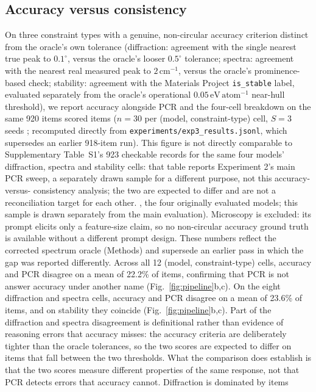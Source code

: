 \documentclass[pdflatex,sn-nature]{sn-jnl}
\newcommand{\rev}[1]{#1} %
\newcommand{\rev}[1]{{\color{blue}#1}} %
\providecommand{\DIFadd}[1]{{\protect\color{blue} \sf #1}} %
\providecommand{\DIFdel}[1]{{\protect\color{red} \scriptsize #1}} %
\providecommand{\DIFaddbegin}{} %
\providecommand{\DIFaddend}{} %
\providecommand{\DIFdelbegin}{} %
\providecommand{\DIFdelend}{} %
\providecommand{\DIFscaledelfig}{0.5}
\newlength{\DIFdelgraphicswidth} %
\newlength{\DIFdelgraphicsheight} %
\providecommand{\DIFaddincludegraphics}[2][]{{\color{blue}\fbox{\DIFOincludegraphics[#1]{#2}}}} %
\providecommand{\DIFdelincludegraphics}[2][]{%
\sbox{\DIFdelgraphicsbox}{\DIFOincludegraphics[#1]{#2}}%
\settoboxwidth{\DIFdelgraphicswidth}{\DIFdelgraphicsbox} %
\settoboxtotalheight{\DIFdelgraphicsheight}{\DIFdelgraphicsbox} %
\scalebox{\DIFscaledelfig}{%
\parbox[b]{\DIFdelgraphicswidth}{\usebox{\DIFdelgraphicsbox}\\[-\baselineskip] \rule{\DIFdelgraphicswidth}{0em}}\llap{\resizebox{\DIFdelgraphicswidth}{\DIFdelgraphicsheight}{%
\setlength{\unitlength}{\DIFdelgraphicswidth}%
\begin{picture}(1,1)%
\thicklines\linethickness{2pt} %
{\color[rgb]{1,0,0}\put(0,0){\framebox(1,1){}}}%
{\color[rgb]{1,0,0}\put(0,0){\line( 1,1){1}}}%
{\color[rgb]{1,0,0}\put(0,1){\line(1,-1){1}}}%
\end{picture}%
}\hspace*{3pt}}} %
} %
\DeclareRobustCommand{\DIFaddbegin}{\DIFOaddbegin \let\includegraphics\DIFaddincludegraphics} %
\DeclareRobustCommand{\DIFaddend}{\DIFOaddend \let\includegraphics\DIFOincludegraphics} %
\DeclareRobustCommand{\DIFdelbegin}{\DIFOdelbegin \let\includegraphics\DIFdelincludegraphics} %
\DeclareRobustCommand{\DIFdelend}{\DIFOaddend \let\includegraphics\DIFOincludegraphics} %
\begin{document}
\subsection*{Accuracy versus consistency}
On three constraint types with a genuine, non-circular accuracy criterion distinct
from the oracle's own tolerance (diffraction: agreement with the single nearest true
peak to $0.1^{\circ}$, versus the oracle's looser $0.5^{\circ}$ tolerance; spectra:
agreement with the nearest real measured peak to $2\,\mathrm{cm}^{-1}$, versus the
oracle's prominence-based check; stability: agreement with the Materials
Project \texttt{is\_stable} label, evaluated separately from the oracle's
operational $0.05\,\mathrm{eV\,atom^{-1}}$ near-hull threshold), we report
accuracy alongside PCR and the four-cell breakdown on the same
\DIFdelbegin \DIFdel{920 items }\DIFdelend \DIFaddbegin \DIFadd{\rev{838 scored items} }\DIFaddend ($n=30$ per (model, constraint-type) cell, $S=3$ seeds\DIFdelbegin \DIFdel{; recomputed directly from
\texttt{experiments/exp3\_results.jsonl}, which supersedes an earlier 918-item run). This
figure is not directly comparable to Supplementary Table~S1's 923 checkable records for the
same four models' diffraction, spectra and stability cells: that table reports Experiment 2's
main PCR sweep, a separately drawn sample for a different purpose, not this accuracy-versus-
consistency analysis; the two are expected to differ and are not a reconciliation target for
each other. }\DIFdelend \DIFaddbegin \DIFadd{\rev{, the four originally evaluated
models; this sample is drawn separately from the main evaluation}). }\DIFaddend Microscopy is excluded: its
prompt elicits only a feature-size claim, so no non-circular accuracy ground truth is
available without a different prompt design. \DIFdelbegin \DIFdel{These numbers reflect the corrected
spectrum oracle (Methods) and supersede an earlier pass in which the gap was reported
differently. Across all 12 (model, constraint-type) cells,
accuracy and PCR disagree on a mean of 22.2\% of items, confirming that PCR is not
answer accuracy under another name (Fig.~\ref{fig:pipeline}b,c). }\DIFdelend \DIFaddbegin \DIFadd{\rev{On the eight diffraction and spectra cells,
accuracy and PCR disagree on a mean of 23.6\% of items, and on stability they coincide
(Fig.~\ref{fig:pipeline}b,c). Part of the diffraction and spectra disagreement is definitional rather
than evidence of reasoning errors that accuracy misses: the accuracy criteria are deliberately tighter
than the oracle tolerances, so the two scores are expected to differ on items that fall between the two
thresholds. What the comparison does establish is that
the two scores measure different properties of the same response, not that PCR detects errors that
accuracy cannot.} }\DIFaddend Diffraction is dominated by items
\end{document}

